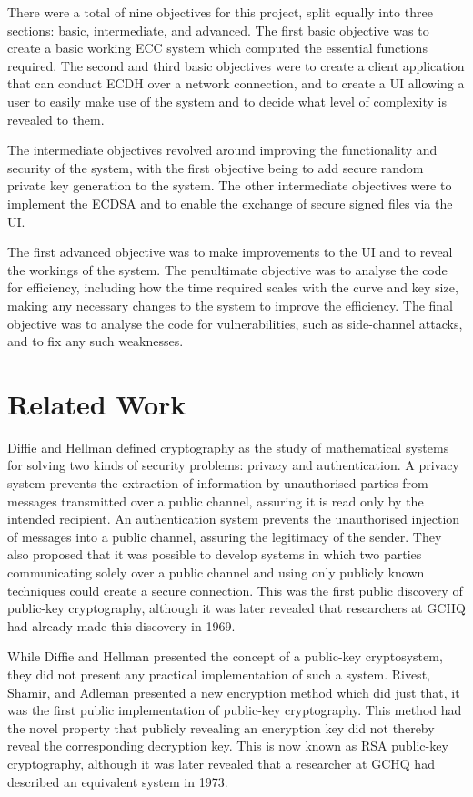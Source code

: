 \documentclass[12pt,a4paper]{article}
\begin{document}
There were a total of nine objectives for this project, split equally into three sections: basic, intermediate, and advanced. 
The first basic objective was to create a basic working ECC system which computed the essential functions required. 
The second and third basic objectives were to create a client application that can conduct ECDH over a network connection, 
and to create a UI allowing a user to easily make use of the system and to decide what level of complexity is revealed to them. 

The intermediate objectives revolved around improving the functionality and security of the system, 
with the first objective being to add secure random private key generation to the system. 
The other intermediate objectives were to implement the ECDSA and to enable the exchange of secure signed files via the UI. 

The first advanced objective was to make improvements to the UI and to reveal the workings of the system. 
The penultimate objective was to analyse the code for efficiency, including how the time required scales with the curve and key size, 
making any necessary changes to the system to improve the efficiency. 
The final objective was to analyse the code for vulnerabilities, such as side-channel attacks, and to fix any such weaknesses. 



\section{Related Work} \noindent
Diffie and Hellman \citeyear{1055638} defined cryptography as the study of 
mathematical systems for solving two kinds of security problems: privacy and authentication. 
A privacy system prevents the extraction of information by unauthorised parties from messages transmitted over a public channel, 
assuring it is read only by the intended recipient. 
An authentication system prevents the unauthorised injection of messages into a public channel, assuring the legitimacy of the sender. 
They also proposed that it was possible to develop systems in which two parties 
communicating solely over a public channel and using only publicly known techniques could create a secure connection. 
This was the first public discovery of public-key cryptography, 
although it was later revealed that researchers at GCHQ had already made this discovery in 1969. 

While Diffie and Hellman presented the concept of a public-key cryptosystem, they did not present any practical implementation of such a system. 
Rivest, Shamir, and Adleman \citeyear{10.1145/359340.359342} presented a new encryption method which did just that, 
it was the first public implementation of public-key cryptography. 
This method had the novel property that publicly revealing an encryption key did not thereby reveal the corresponding decryption key. 
This is now known as RSA public-key cryptography, 
although it was later revealed that a researcher at GCHQ had described an equivalent system in 1973. 
\end{document}
